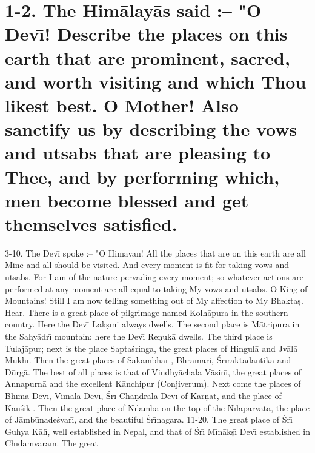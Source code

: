 \chapter{1-2. The Him\=alay\=as said :-- "O Dev\={\i}! Describe the places on this earth that are prominent, sacred, and worth visiting and which Thou likest best. O Mother! Also sanctify us by describing the vows and utsabs that are pleasing to Thee, and by performing which, men become blessed and get themselves satisfied.}
3-10. The Dev\={\i} spoke :-- "O Himavan! All the places that are on this earth are all Mine and all should be visited. And every moment is fit for taking vows and utsabs. For I am of the nature pervading every moment; so whatever actions are performed at any moment are all equal to taking My vows and utsabs. O King of Mountains! Still I am now telling something out of My affection to My Bhakta\d{s}. Hear. There is a great place of pilgrimage named Kolh\=apura in the southern country. Here the Dev\={\i} Lak\d{s}mi always dwells. The second place is M\=atripura in the Sahy\=adr\={\i} mountain; here the Dev\={\i} Re\d{n}uk\=a dwells. The third place is Tulaj\=apur; next is the place Sapta\'sringa, the great places of Hingul\=a and Jv\=al\=a Mukh\={\i}. Then the great places of S\=akambhar\={\i}, Bhr\=am\=ari, \'Sr\={\i}raktadantik\=a and D\=urg\=a. The best of all places is that of Vindhy\=achala V\=asin\={\i}, the great places of Annapurn\=a and the excellent K\=anchipur (Conjiverum). Next come the places of Bh\={\i}m\=a Dev\={\i}, Vimal\=a Dev\={\i}, \'Sr\={\i} Cha\d{n}dral\=a Dev\={\i} of Kar\d{n}\=at, and the place of Kau\'sik\={\i}. Then the great place of N\={\i}l\=amb\=a on the top of the N\={\i}l\=aparvata, the place of J\=amb\=unade\'svar\={\i}, and the beautiful \'Sr\={\i}nagara.
11-20. The great place of \'Sr\={\i} Guhya K\=al\={\i}, well established in Nepal, and that of \'Sr\={\i} M\={\i}n\=ak\d{s}\={\i} Dev\={\i} established in Ch\={\i}damvaram. The great

